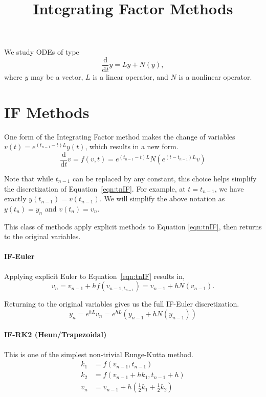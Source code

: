 \documentclass{article}
\title{Integrating Factor Methods}
\newcommand{\ddt}{\frac{\mathrm{d}}{\mathrm{d}t}}
\theoremstyle{definition}
\begin{document}
\maketitle
We study ODEs of type
\begin{equation}
	\ddt y = Ly + N(y),
\end{equation}
where $y$ may be a vector, $L$ is a linear operator, and $N$ is a nonlinear operator. 
\section{IF Methods}
One form of the Integrating Factor method makes the change of variables $v(t)=e^{(t_{n-1}-t)L}y(t)$, which results in a new form.
\begin{equation}
	\ddt v = f(v,t) = e^{(t_{n-1}-t)L} N(e^{(t-t_{n-1})L} v)
	\label{eqn:tnIF}
\end{equation}

Note that while $t_{n-1}$ can be replaced by any constant, this choice helps simplify the discretization of Equation~\ref{eqn:tnIF}.
For example, at $t=t_{n-1}$, we have exactly $y(t_{n-1})=v(t_{n-1})$. 
We will simplify the above notation as $y(t_n) = y_n$ and $v(t_n) = v_n$. 


This class of methods apply explicit methods to Equation \ref{eqn:tnIF}, then returns to the original variables. 

\paragraph{IF-Euler} Applying explicit Euler to Equation~\ref{eqn:tnIF} results in,
\begin{equation*}
v_n = v_{n-1} + h f(v_{n-1, t_{n-1}}) = v_{n-1} + h N(v_{n-1}). 
\end{equation*}

Returning to the original variables gives us the full IF-Euler discretization.
\begin{equation}
y_n = e^{hL}v_n =e^{hL} (y_{n-1}+hN(y_{n-1}))
\end{equation}

\paragraph{IF-RK2 (Heun/Trapezoidal)} This is one of the simplest non-trivial Runge-Kutta method. 
\begin{align*}
k_1 &= f(v_{n-1}, t_{n-1})\\
k_2 &= f(v_{n-1}+hk_1, t_{n-1}+h)\\
v_n &= v_{n-1} + h\left(\frac{1}{2}k_1 +\frac{1}{2}k_2\right)
\end{align*}
\end{document}
